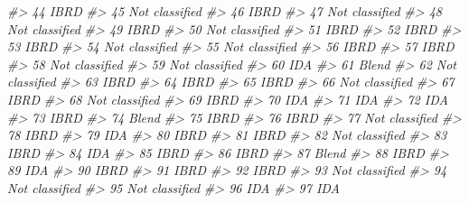 \documentclass[
  xelatex, ja=standard]{bxjsbook}
\newenvironment{Shaded}{\begin{snugshade}}{\end{snugshade}}
\newcommand{\CommentTok}[1]{\textcolor[rgb]{0.56,0.35,0.01}{\textit{#1}}}
\theoremstyle{definition}
\theoremstyle{definition}
\theoremstyle{definition}
\theoremstyle{definition}
\theoremstyle{remark}
\begin{document}
\begin{Shaded}
\begin{Highlighting}[]
\CommentTok{\#\textgreater{} 44            IBRD}
\CommentTok{\#\textgreater{} 45  Not classified}
\CommentTok{\#\textgreater{} 46            IBRD}
\CommentTok{\#\textgreater{} 47  Not classified}
\CommentTok{\#\textgreater{} 48  Not classified}
\CommentTok{\#\textgreater{} 49            IBRD}
\CommentTok{\#\textgreater{} 50  Not classified}
\CommentTok{\#\textgreater{} 51            IBRD}
\CommentTok{\#\textgreater{} 52            IBRD}
\CommentTok{\#\textgreater{} 53            IBRD}
\CommentTok{\#\textgreater{} 54  Not classified}
\CommentTok{\#\textgreater{} 55  Not classified}
\CommentTok{\#\textgreater{} 56            IBRD}
\CommentTok{\#\textgreater{} 57            IBRD}
\CommentTok{\#\textgreater{} 58  Not classified}
\CommentTok{\#\textgreater{} 59  Not classified}
\CommentTok{\#\textgreater{} 60             IDA}
\CommentTok{\#\textgreater{} 61           Blend}
\CommentTok{\#\textgreater{} 62  Not classified}
\CommentTok{\#\textgreater{} 63            IBRD}
\CommentTok{\#\textgreater{} 64            IBRD}
\CommentTok{\#\textgreater{} 65            IBRD}
\CommentTok{\#\textgreater{} 66  Not classified}
\CommentTok{\#\textgreater{} 67            IBRD}
\CommentTok{\#\textgreater{} 68  Not classified}
\CommentTok{\#\textgreater{} 69            IBRD}
\CommentTok{\#\textgreater{} 70             IDA}
\CommentTok{\#\textgreater{} 71             IDA}
\CommentTok{\#\textgreater{} 72             IDA}
\CommentTok{\#\textgreater{} 73            IBRD}
\CommentTok{\#\textgreater{} 74           Blend}
\CommentTok{\#\textgreater{} 75            IBRD}
\CommentTok{\#\textgreater{} 76            IBRD}
\CommentTok{\#\textgreater{} 77  Not classified}
\CommentTok{\#\textgreater{} 78            IBRD}
\CommentTok{\#\textgreater{} 79             IDA}
\CommentTok{\#\textgreater{} 80            IBRD}
\CommentTok{\#\textgreater{} 81            IBRD}
\CommentTok{\#\textgreater{} 82  Not classified}
\CommentTok{\#\textgreater{} 83            IBRD}
\CommentTok{\#\textgreater{} 84             IDA}
\CommentTok{\#\textgreater{} 85            IBRD}
\CommentTok{\#\textgreater{} 86            IBRD}
\CommentTok{\#\textgreater{} 87           Blend}
\CommentTok{\#\textgreater{} 88            IBRD}
\CommentTok{\#\textgreater{} 89             IDA}
\CommentTok{\#\textgreater{} 90            IBRD}
\CommentTok{\#\textgreater{} 91            IBRD}
\CommentTok{\#\textgreater{} 92            IBRD}
\CommentTok{\#\textgreater{} 93  Not classified}
\CommentTok{\#\textgreater{} 94  Not classified}
\CommentTok{\#\textgreater{} 95  Not classified}
\CommentTok{\#\textgreater{} 96             IDA}
\CommentTok{\#\textgreater{} 97             IDA}

\end{Highlighting}
\end{Shaded}
\end{document}
